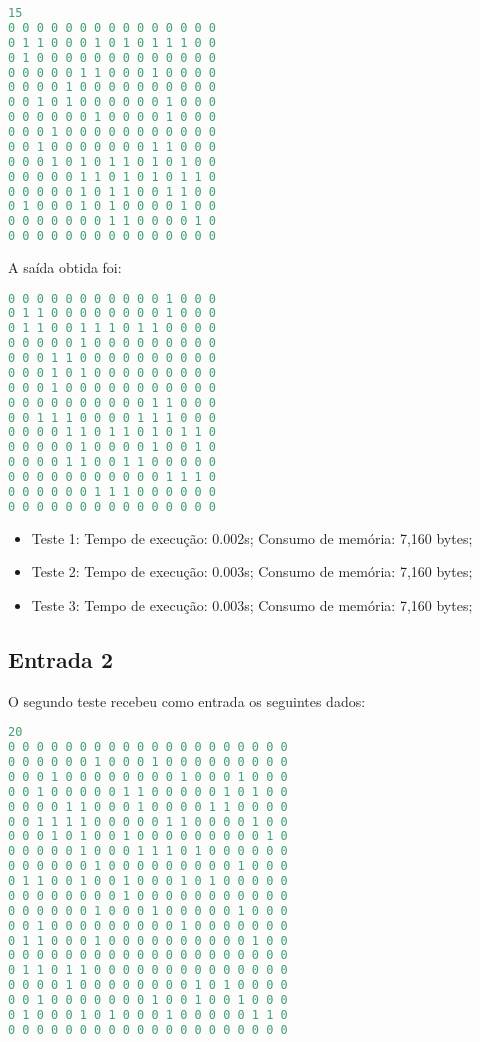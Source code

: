 \documentclass{article}
\begin{document}
\begin{lstlisting}[caption={Entrada 1.},label={lst:cod5},language=C]
15
0 0 0 0 0 0 0 0 0 0 0 0 0 0 0
0 1 1 0 0 0 1 0 1 0 1 1 1 0 0
0 1 0 0 0 0 0 0 0 0 0 0 0 0 0
0 0 0 0 0 1 1 0 0 0 1 0 0 0 0
0 0 0 0 1 0 0 0 0 0 0 0 0 0 0
0 0 1 0 1 0 0 0 0 0 0 1 0 0 0
0 0 0 0 0 0 1 0 0 0 0 1 0 0 0
0 0 0 1 0 0 0 0 0 0 0 0 0 0 0
0 0 1 0 0 0 0 0 0 0 1 1 0 0 0
0 0 0 1 0 1 0 1 1 0 1 0 1 0 0
0 0 0 0 0 1 1 0 1 0 1 0 1 1 0
0 0 0 0 0 1 0 1 1 0 0 1 1 0 0
0 1 0 0 0 1 0 1 0 0 0 0 1 0 0
0 0 0 0 0 0 0 1 1 0 0 0 0 1 0
0 0 0 0 0 0 0 0 0 0 0 0 0 0 0
 \end{lstlisting}
 
 \hfill\break
 
\noindent A saída obtida foi: 
 \begin{lstlisting}[caption={Saída 1.},label={lst:cod6},language=C]
0 0 0 0 0 0 0 0 0 0 0 1 0 0 0
0 1 1 0 0 0 0 0 0 0 0 1 0 0 0
0 1 1 0 0 1 1 1 0 1 1 0 0 0 0
0 0 0 0 0 1 0 0 0 0 0 0 0 0 0
0 0 0 1 1 0 0 0 0 0 0 0 0 0 0
0 0 0 1 0 1 0 0 0 0 0 0 0 0 0
0 0 0 1 0 0 0 0 0 0 0 0 0 0 0
0 0 0 0 0 0 0 0 0 0 1 1 0 0 0
0 0 1 1 1 0 0 0 0 1 1 1 0 0 0
0 0 0 0 1 1 0 1 1 0 1 0 1 1 0
0 0 0 0 0 1 0 0 0 0 1 0 0 1 0
0 0 0 0 1 1 0 0 1 1 0 0 0 0 0
0 0 0 0 0 0 0 0 0 0 0 1 1 1 0
0 0 0 0 0 0 1 1 1 0 0 0 0 0 0
0 0 0 0 0 0 0 0 0 0 0 0 0 0 0
 \end{lstlisting}
 
 \hfill\break
 
\begin{itemize}
\item Teste 1: Tempo de execução: 0.002s; Consumo de memória: 7,160 bytes;
\item Teste 2: Tempo de execução: 0.003s; Consumo de memória: 7,160 bytes;
\item Teste 3: Tempo de execução: 0.003s; Consumo de memória: 7,160 bytes;
\end{itemize}
\clearpage

\subsection{Entrada 2}
\noindent O segundo teste recebeu como entrada os seguintes dados: 

\begin{lstlisting}[caption={Entrada 2.},label={lst:cod7},language=C]
20
0 0 0 0 0 0 0 0 0 0 0 0 0 0 0 0 0 0 0 0
0 0 0 0 0 0 1 0 0 0 1 0 0 0 0 0 0 0 0 0
0 0 0 1 0 0 0 0 0 0 0 0 1 0 0 0 1 0 0 0
0 0 1 0 0 0 0 0 1 1 0 0 0 0 0 1 0 1 0 0
0 0 0 0 1 1 0 0 0 1 0 0 0 0 1 1 0 0 0 0
0 0 1 1 1 1 0 0 0 0 0 1 1 0 0 0 0 1 0 0
0 0 0 1 0 1 0 0 1 0 0 0 0 0 0 0 0 0 1 0
0 0 0 0 0 1 0 0 0 1 1 1 0 1 0 0 0 0 0 0
0 0 0 0 0 0 1 0 0 0 0 0 0 0 0 0 1 0 0 0
0 1 1 0 0 1 0 0 1 0 0 0 1 0 1 0 0 0 0 0
0 0 0 0 0 0 0 0 1 0 0 0 0 0 0 0 0 0 0 0
0 0 0 0 0 0 1 0 0 0 1 0 0 0 0 0 1 0 0 0
0 0 1 0 0 0 0 0 0 0 0 0 1 0 0 0 0 0 0 0
0 1 1 0 0 0 1 0 0 0 0 0 0 0 0 0 0 1 0 0
0 0 0 0 0 0 0 0 0 0 0 0 0 0 0 0 0 0 0 0
0 1 1 0 1 1 0 0 0 0 0 0 0 0 0 0 0 0 0 0
0 0 0 0 1 0 0 0 0 0 0 0 0 1 0 1 0 0 0 0
0 0 1 0 0 0 0 0 0 0 1 0 0 1 0 0 1 0 0 0
0 1 0 0 0 1 0 1 0 0 0 1 0 0 0 0 0 1 1 0
0 0 0 0 0 0 0 0 0 0 0 0 0 0 0 0 0 0 0 0
 \end{lstlisting}
 
\end{document}

